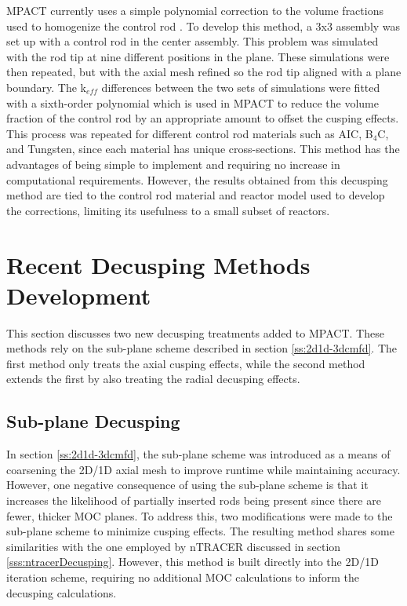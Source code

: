 MPACT currently uses a simple polynomial correction to the volume fractions used to homogenize the control rod \cite{MC2015_VCS_Cycle_Depletion}.  To develop this method, a 3x3 assembly was set up with a control rod in the center assembly.  This problem was simulated with the rod tip at nine different positions in the plane.  These simulations were then repeated, but with the axial mesh refined so the rod tip aligned with a plane boundary.  The k$_{eff}$ differences between the two sets of simulations were fitted with a sixth-order polynomial which is used in MPACT to reduce the volume fraction of the control rod by an appropriate amount to offset the cusping effects.  This process was repeated for different control rod materials such as AIC, B$_4$C, and Tungsten, since each material has unique cross-sections.  This method has the advantages of being simple to implement and requiring no increase in computational requirements.  However, the results obtained from this decusping method are tied to the control rod material and reactor model used to develop the corrections, limiting its usefulness to a small subset of reactors.

\section{Recent Decusping Methods Development}

This section discusses two new decusping treatments added to MPACT.  These methods rely on the sub-plane scheme described in section \ref{ss:2d1d-3dcmfd}.  The first method only treats the axial cusping effects, while the second method extends the first by also treating the radial decusping effects.

\subsection{Sub-plane Decusping}

In section \ref{ss:2d1d-3dcmfd}, the sub-plane scheme was introduced as a means of coarsening the 2D/1D axial mesh to improve runtime while maintaining accuracy.  However, one negative consequence of using the sub-plane scheme is that it increases the likelihood of partially inserted rods being present since there are fewer, thicker MOC planes.  To address this, two modifications were made to the sub-plane scheme to minimize cusping effects.  The resulting method shares some similarities with the one employed by nTRACER discussed in section \ref{sss:ntracerDecusping}.  However, this method is built directly into the 2D/1D iteration scheme, requiring no additional MOC calculations to inform the decusping calculations.

